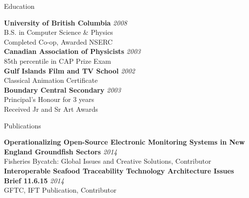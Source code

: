 \documentclass{resume} %
\begin{document}
\begin{rSection}{Education}

{\bf University of British Columbia} \hfill {\em 2008} \\ 
B.S. in Computer Science \& Physics \\
Completed Co-op, Awarded NSERC \\

{\bf Canadian Association of Physicists} \hfill {\em 2003} \\ 
85th percentile in CAP Prize Exam \\

{\bf Gulf Islands Film and TV School} \hfill {\em 2002} \\ 
Classical Animation Certificate \\

{\bf Boundary Central Secondary} \hfill {\em 2003} \\ 
Principal's Honour for 3 years \\
Received Jr and Sr Art Awards \\

\end{rSection}


\begin{rSection}{Publications}

{\bf Operationalizing Open-Source Electronic Monitoring Systems in New England Groundfish Sectors} \hfill {\em 2014} \\ 
Fisheries Bycatch: Global Issues and Creative Solutions, Contributor \\

{\bf Interoperable Seafood Traceability Technology Architecture Issues Brief 11.6.15} \hfill {\em 2014} \\ 
GFTC, IFT Publication, Contributor \\

\end{rSection}
\end{document}
